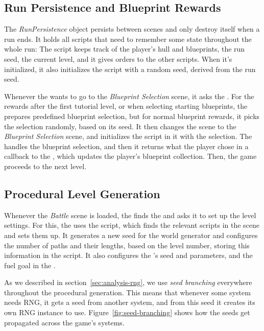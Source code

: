 \subsection{Run Persistence and Blueprint Rewards}

The \emph{RunPersistence} object persists between scenes and only destroy itself when a run ends.
It holds all scripts that need to remember some state throughout the whole run:
The  script keeps track of the player's hull and blueprints, the run seed, the current level, and it gives orders to the other scripts.
When it's initialized, it also initializes the  script with a random seed, derived from the run seed.

Whenever the  wants to go to the \emph{Blueprint Selection} scene, it asks the .
For the rewards after the first tutorial level, or when selecting starting blueprints, the  prepares predefined blueprint selection, but for normal blueprint rewards, it picks the selection randomly, based on its seed.
It then changes the scene to the \emph{Blueprint Selection} scene, and initializes the  script in it with the selection.
The  handles the blueprint selection, and then it returns what the player chose in a callback to the , which updates the player's blueprint collection.
Then, the game proceeds to the next level.

\subsection{Procedural Level Generation}

Whenever the \emph{Battle} scene is loaded, the  finds the  and asks it to set up the level settings.
For this, the  uses the  script, which finds the relevant scripts in the scene and sets them up.
It generates a new seed for the world generator and configures the number of paths and their lengths, based on the level number, storing this information in the  script.
It also configures the 's seed and parameters, and the fuel goal in the .

As we described in section~\ref{sec:analysis-rng}, we use \emph{seed branching} everywhere throughout the procedural generation.
This means that whenever some system needs RNG, it gets a seed from another system, and from this seed it creates its own RNG instance to use.
Figure~\ref{fig:seed-branching} shows how the seeds get propagated across the game's systems.


